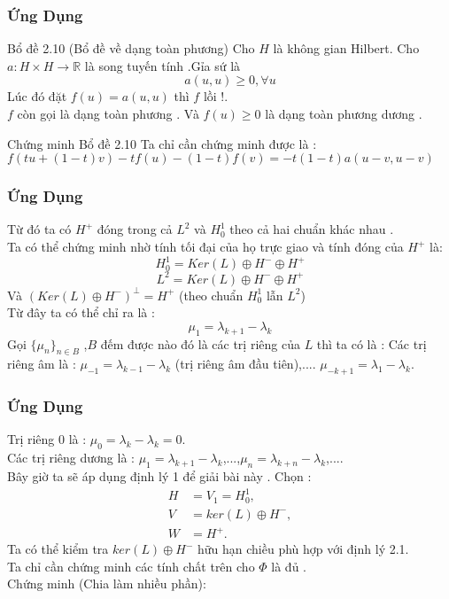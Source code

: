 \documentclass{beamer}
\begin{document}
\begin{frame}
\frametitle{Ứng Dụng}
\begin{block}{Bổ đề 2.10 (Bổ đề về dạng toàn phương)}
Cho $H$ là không gian Hilbert. Cho $a:H\times H\rightarrow \mathbb{R}$ là song tuyến tính .Gỉa sứ là $$a(u,u)\geq 0,\forall u $$
Lúc đó đặt $f(u)=a(u,u)$ thì $f$ lồi !.\\
$f$ còn gọi là dạng toàn phương . Và $f(u)\geq 0 $ là dạng toàn phương dương .
\end{block}
\begin{block}{Chứng minh Bổ đề 2.10}
Ta chỉ cần chứng minh được là :
$f(tu+(1-t)v)-tf(u)-(1-t)f(v)=-t(1-t)a(u-v,u-v)$
\end{block}
\end{frame}



\begin{frame}
\frametitle{Ứng Dụng}
\noindent Từ đó ta có $H^+$ đóng trong cả $L^2$ và $H^1_0$ theo cả hai chuẩn khác nhau .\\
Ta có thể chứng minh nhờ tính tối đại của họ trực giao và tính đóng của $H^+$ là: $$H^1_0=Ker(L)\oplus H^{-}\oplus H^{+}$$
$$L^2=Ker(L)\oplus H^{-}\oplus H^{+}$$
Và $(Ker(L)\oplus H^{-})^{\perp}=H^{+}$ (theo chuẩn $H^1_0$ lẫn $L^2$)\\
Từ đây ta có thể chỉ ra là :$$\mu_1=\lambda_{k+1}-\lambda_{k}$$
Gọi $\{ \mu_n \}_{n\in B}$ ,$B$ đếm được nào đó là các trị riêng của $L$ thì ta có là :
Các trị riêng âm là : $\mu_{-1}=\lambda_{k-1}-\lambda_k$ (trị riêng âm đầu tiên),.... $\mu_{-k+1}=\lambda_{1}-\lambda_{k}$.\\

\end{frame}

\begin{frame}
\frametitle{Ứng Dụng}
Trị riêng 0 là : $\mu_0=\lambda_k-\lambda_k=0$.\\ 
Các trị riêng dương là : $\mu_{1}=\lambda_{k+1}-\lambda_k$,...,$\mu_{n}=\lambda_{k+n}-\lambda_k$,....\\
Bây giờ ta sẽ áp dụng định lý 1 để giải bài này .
\noindent  Chọn :
\begin{align*}
H&=V_1=H_{0}^1,\\
V&=ker(L)\oplus H^{-},\\
W&=H^{+}.
\end{align*}
Ta có thể kiểm tra $ker(L)\oplus H^{-}$ hữu hạn chiều phù hợp với định lý 2.1.\\
Ta chỉ cần chứng minh các tính chất trên cho $\Phi$ là đủ .\\
Chứng minh (Chia làm nhiều phần):\\
\end{frame}
\end{document}
